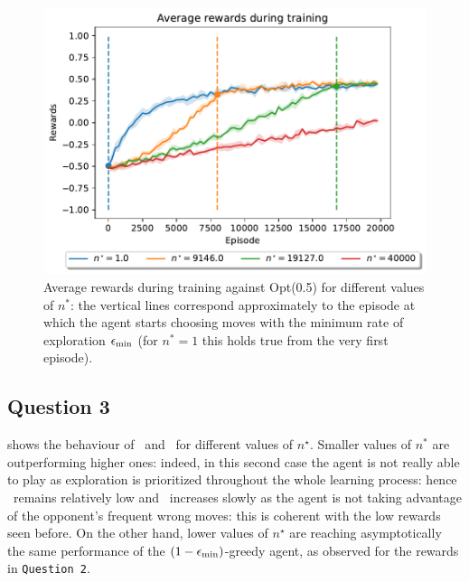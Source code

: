 \documentclass[10pt]{IEEEtran}
\begin{document}

\begin{figure}[h]
    \centering
    \includegraphics[width = 0.85\linewidth]{code/figures/rewards_n_star.pdf}
    \caption{Average rewards during training against Opt(0.5) for different values of $n^{*}$: the vertical lines correspond approximately to the episode at which the agent starts choosing moves with the minimum rate of exploration $\epsilon_{\text{min}}$ (for $n^{*} = 1$ this holds true from the very first episode).}
    \label{plot_question2}
\end{figure}

\subsection*{Question 3}
 shows the behaviour of \mopt\ and \mrand\ for different values of $n^{\star}$. Smaller values of $n^{*}$ are outperforming higher ones: indeed, in this second case the agent is not really able to play as exploration is prioritized throughout the whole learning process: hence \mopt\ remains relatively low and \mrand\ increases slowly as the agent is not taking advantage of the opponent's frequent wrong moves: this is coherent with the low rewards seen before. On the other hand, lower values of $n^{\star}$ are reaching asymptotically the same performance of the $(1-\epsilon_{\text{min}})$-greedy agent, as observed for the rewards in \texttt{Question 2}.
\end{document}
